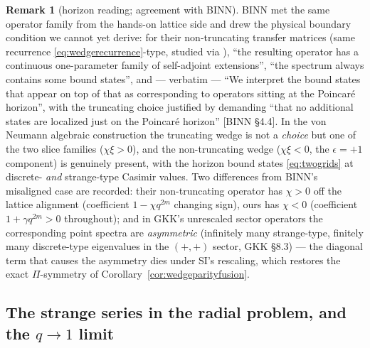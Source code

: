 \documentclass[11pt,a4paper]{article}
\theoremstyle{definition}
\newtheorem{remark}[definition]{Remark}
\theoremstyle{plain}
\begin{document}
\begin{remark}[horizon reading; agreement with BINN]\label{rem:binnhorizon}
BINN \cite{Berkooz:2022qgroup} met the same operator family from the hands-on lattice side
and drew the physical boundary condition we cannot yet derive: for their non-truncating
transfer matrices (same recurrence \eqref{eq:wedgerecurrence}-type, studied via
\cite{Koelink:2003oneparam}), ``the resulting operator has a continuous one-parameter
family of self-adjoint extensions'', ``the spectrum always contains some bound states'',
and --- verbatim --- ``We interpret the bound states that appear on top of that as
corresponding to operators sitting at the Poincar\'e horizon'', with the truncating choice
justified by demanding ``that no additional states are localized just on the Poincar\'e
horizon'' [BINN \S4.4]. In the von Neumann algebraic construction the truncating wedge is
not a \emph{choice} but one of the two slice families ($\chi\xi>0$), and the non-truncating
wedge ($\chi\xi<0$, the $\epsilon=+1$ component) is genuinely present, with the horizon
bound states \eqref{eq:twogrids} at discrete- \emph{and} strange-type Casimir values. Two
differences from BINN's misaligned case are recorded: their non-truncating operator has
$\chi>0$ off the lattice alignment (coefficient $1-\chi q^{2m}$ changing sign), ours has
$\chi<0$ (coefficient $1+\gamma q^{2m}>0$ throughout); and in GKK's unrescaled sector
operators the corresponding point spectra are \emph{asymmetric} (infinitely many
strange-type, finitely many discrete-type eigenvalues in the $(+,+)$ sector, GKK \S8.3) ---
the diagonal term that causes the asymmetry dies under SI's rescaling, which restores the
exact $\Pi$-symmetry of Corollary~\ref{cor:wedgeparityfusion}.
\end{remark}

\subsection{The strange series in the radial problem, and the $q\to1$ limit}
\end{document}
